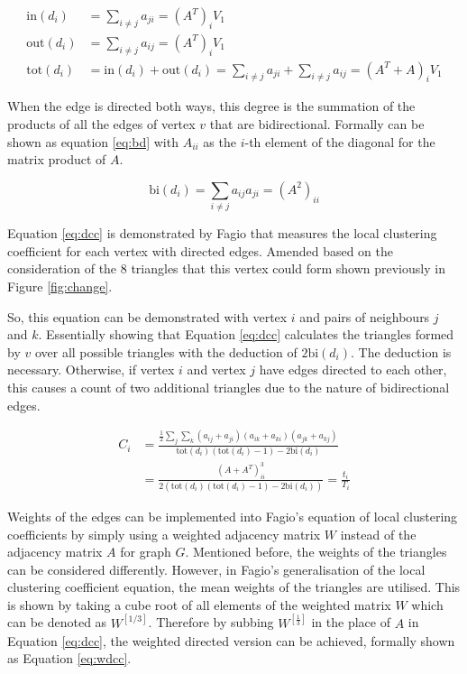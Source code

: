 \begin{align} \label{eq:idod}
\text{in}(d_i) &= \sum_{i\neq j}a_{ji} = (A^T)_i V_1 \\
\text{out}(d_i) &= \sum_{i\neq j}a_{ij} = (A^T)_i V_1 \nonumber \\
\text{tot}(d_i) &= \text{in}(d_i) + \text{out}(d_i) = \sum_{i\neq j}a_{ji} + \sum_{i\neq j}a_{ij} = (A^T + A)_i V_1 \nonumber
\end{align}

When the edge is directed both ways, this degree is the summation of the products of all the edges of vertex $v$ that are bidirectional. Formally can be shown as equation \ref{eq:bd} with $A_{ii}$ as the $i$-th element of the diagonal for the matrix product of $A$.

\begin{equation} \label{eq:bd}
\text{bi}(d_i) = \sum_{i\neq j}a_{ij}a_{ji} = (A^2)_{ii} 
\end{equation}
 
Equation \ref{eq:dcc} is demonstrated by Fagio \cite{Fagiolo_2007} that measures the local clustering coefficient for each vertex with directed edges. Amended based on the consideration of the 8 triangles that this vertex could form shown previously in Figure \ref{fig:change}. 

So, this equation can be demonstrated with vertex $i$ and pairs of neighbours $j$ and $k$. Essentially showing that Equation \ref{eq:dcc} calculates the triangles formed by $v$ over all possible triangles with the deduction of $2\text{bi}(d_i)$. The deduction is necessary. Otherwise, if vertex $i$ and vertex $j$ have edges directed to each other, this causes a count of two additional triangles due to the nature of bidirectional edges.

\begin{align} \label{eq:dcc}
C_i &= \frac{\frac{1}{2}\sum_j \sum_k (a_{ij} + a_{ji})(a_{ik} + a_{ki})(a_{jk} + a_{kj})}{\text{tot}(d_i)(\text{tot}(d_i) - 1) - 2\text{bi}(d_i)} \\
&= \frac{(A + A^T)^3_{ii}}{2(\text{tot}(d_i)(\text{tot}(d_i) - 1) - 2\text{bi}(d_i))} = \frac{t_i}{T_i} \nonumber
\end{align}

Weights of the edges can be implemented into Fagio's equation of local clustering coefficients by simply using a weighted adjacency matrix $W$ instead of the adjacency matrix $A$ for graph $G$. Mentioned before, the weights of the triangles can be considered differently. However, in Fagio's generalisation of the local clustering coefficient equation, the mean weights of the triangles are utilised. This is shown by taking a cube root of all elements of the weighted matrix $W$ which can be denoted as $W^{[1/3]}$. Therefore by subbing $W^{[\frac{1}{3}]}$ in the place of $A$ in Equation \ref{eq:dcc}, the weighted directed version can be achieved, formally shown as Equation \ref{eq:wdcc}.

